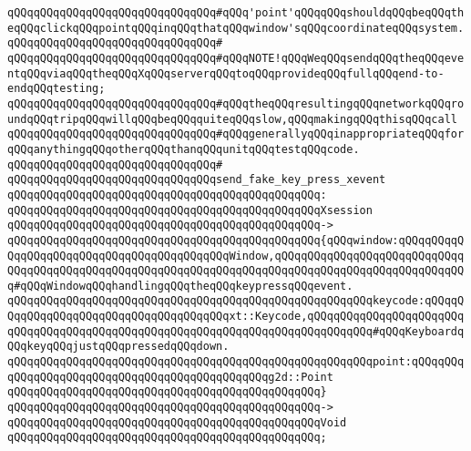 \verb|qQQqqQQqqQQqqQQqqQQqqQQqqQQqqQQq#qQQq'point'qQQqqQQqshouldqQQqbeqQQqtheqQQqclickqQQqpointqQQqinqQQqthatqQQqwindow'sqQQqcoordinateqQQqsystem.|\newline
\verb|qQQqqQQqqQQqqQQqqQQqqQQqqQQqqQQq#|\newline
\verb|qQQqqQQqqQQqqQQqqQQqqQQqqQQqqQQq#qQQqNOTE!qQQqWeqQQqsendqQQqtheqQQqeventqQQqviaqQQqtheqQQqXqQQqserverqQQqtoqQQqprovideqQQqfullqQQqend-to-endqQQqtesting;|\newline
\verb|qQQqqQQqqQQqqQQqqQQqqQQqqQQqqQQq#qQQqtheqQQqresultingqQQqnetworkqQQqroundqQQqtripqQQqwillqQQqbeqQQqquiteqQQqslow,qQQqmakingqQQqthisqQQqcall|\newline
\verb|qQQqqQQqqQQqqQQqqQQqqQQqqQQqqQQq#qQQqgenerallyqQQqinappropriateqQQqforqQQqanythingqQQqotherqQQqthanqQQqunitqQQqtestqQQqcode.|\newline
\verb|qQQqqQQqqQQqqQQqqQQqqQQqqQQqqQQq#|\newline
\verb|qQQqqQQqqQQqqQQqqQQqqQQqqQQqqQQqsend_fake_key_press_xevent|\newline
\verb|qQQqqQQqqQQqqQQqqQQqqQQqqQQqqQQqqQQqqQQqqQQqqQQq:|\newline
\verb|qQQqqQQqqQQqqQQqqQQqqQQqqQQqqQQqqQQqqQQqqQQqqQQqXsession|\newline
\verb|qQQqqQQqqQQqqQQqqQQqqQQqqQQqqQQqqQQqqQQqqQQqqQQq->|\newline
\verb|qQQqqQQqqQQqqQQqqQQqqQQqqQQqqQQqqQQqqQQqqQQqqQQq{qQQqwindow:qQQqqQQqqQQqqQQqqQQqqQQqqQQqqQQqqQQqqQQqqQQqWindow,qQQqqQQqqQQqqQQqqQQqqQQqqQQqqQQqqQQqqQQqqQQqqQQqqQQqqQQqqQQqqQQqqQQqqQQqqQQqqQQqqQQqqQQqqQQqqQQqqQQq#qQQqWindowqQQqhandlingqQQqtheqQQqkeypressqQQqevent.|\newline
\verb|qQQqqQQqqQQqqQQqqQQqqQQqqQQqqQQqqQQqqQQqqQQqqQQqqQQqqQQqkeycode:qQQqqQQqqQQqqQQqqQQqqQQqqQQqqQQqqQQqqQQqxt::Keycode,qQQqqQQqqQQqqQQqqQQqqQQqqQQqqQQqqQQqqQQqqQQqqQQqqQQqqQQqqQQqqQQqqQQqqQQqqQQqqQQq#qQQqKeyboardqQQqkeyqQQqjustqQQqpressedqQQqdown.|\newline
\verb|qQQqqQQqqQQqqQQqqQQqqQQqqQQqqQQqqQQqqQQqqQQqqQQqqQQqqQQqpoint:qQQqqQQqqQQqqQQqqQQqqQQqqQQqqQQqqQQqqQQqqQQqqQQqg2d::Point|\newline
\verb|qQQqqQQqqQQqqQQqqQQqqQQqqQQqqQQqqQQqqQQqqQQqqQQq}|\newline
\verb|qQQqqQQqqQQqqQQqqQQqqQQqqQQqqQQqqQQqqQQqqQQqqQQq->|\newline
\verb|qQQqqQQqqQQqqQQqqQQqqQQqqQQqqQQqqQQqqQQqqQQqqQQqVoid|\newline
\verb|qQQqqQQqqQQqqQQqqQQqqQQqqQQqqQQqqQQqqQQqqQQqqQQq;|\newline
